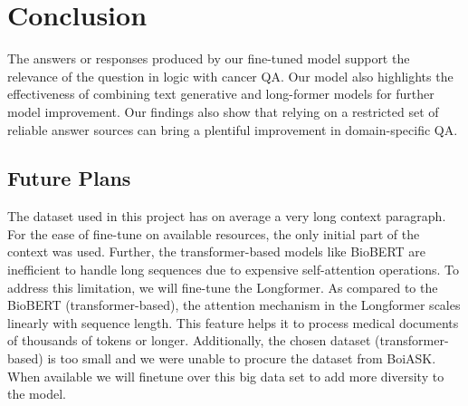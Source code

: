 \section*{Conclusion}
	The answers or responses produced by our fine-tuned model support the relevance of the question in logic with cancer QA. Our model also highlights the effectiveness of combining text generative and long-former models for further model improvement. Our findings also show that relying on a restricted set of reliable answer sources can bring a plentiful improvement in domain-specific QA.
	
	\subsection*{Future Plans}
		The dataset used in this project has on average a very long context paragraph. For the ease of fine-tune on available resources, the only initial part of the context was used. Further, the transformer-based models like BioBERT are inefficient to handle long sequences due to expensive self-attention operations. To address this limitation, we will fine-tune the Longformer. As compared to the BioBERT (transformer-based), the attention mechanism in the Longformer scales linearly with sequence length. This feature helps it to process medical documents of thousands of tokens or longer. 
		Additionally, the chosen dataset (transformer-based) is too small and we were unable to procure the dataset from BoiASK. When available we will finetune over this big data set to add more diversity to the model.